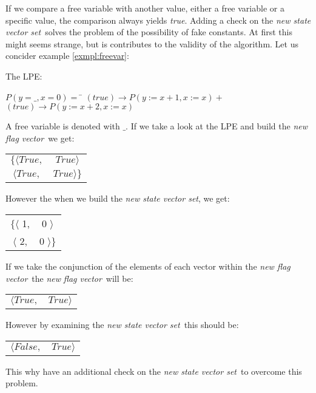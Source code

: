 \documentclass[a4paper,10pt]{article}
\newcommand{\ti}{\textit}
\newcommand{\fv}{\textit{flag vector}}
\newcommand{\svs}{\textit{new state vector set}}
\newcommand{\nfv}{\textit{new flag vector}}
\begin{document}
If we compare a free variable with another value, either a free variable or a specific value, the comparison always yields \ti{true}. Adding a check on the \svs\ solves the problem of the possibility of fake constants. At first this might seems strange, but is contributes to the validity of the algorithm. Let us concider example \ref{exmpl:freevar}:
\begin{example}\label{exmpl:freevar} The LPE: 
\begin{tabbing}
$P(y = \_,x = 0) =$ \= $(true) \rightarrow  P(y := x+1, x := x) + $ \\
	    \> $(true)
 \rightarrow P(y := x+2, x := x)$
\end{tabbing}

A free variable is denoted with $\_$. If we take a look at the LPE and build the \nfv\ we get:
\begin{center}
\begin{tabular}{cc} 
 $\lbrace \langle True, $ & $ True \rangle$\\
 $\langle True, $ & $ True \rangle \rbrace$\\
\end{tabular} 
\end{center}

However the when we build the \svs , we get:
\begin{center}
\begin{tabular}{cc} 
 $\lbrace \langle$ 1, & 0 $\rangle$\\
 $\langle$ 2, & 0 $\rangle \rbrace$\\
\end{tabular}  
\end{center}

If we take the conjunction of the elements of each vector within the \nfv\ the \ti{new} \fv\ will be:
\begin{center}
\begin{tabular}{cc} 
 $\langle True, $ & $ True \rangle$\\
\end{tabular}
\end{center}

However by examining the \svs\ this should be: 
\begin{center}
\begin{tabular}{cc} 
 $\langle False, $ & $ True \rangle$\\
\end{tabular}
\end{center}

This why have an additional check on the \svs\ to overcome this problem.
\end{example}
\end{document}
